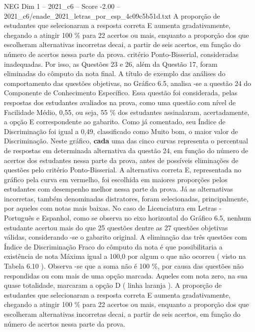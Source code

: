 \begin{textsample}{NEG Dim 1 – 2021\_c6 – Score -2.00 – 2021\_c6/enade\_2021\_letras\_por\_esp\_4c09c5b51d.txt}
A proporção de estudantes que selecionaram a resposta correta E aumenta gradativamente, chegando a atingir 100 \% para 22 acertos ou mais, enquanto a proporção dos que escolheram alternativas incorretas decai, a partir de seis acertos, em função do número de acertos nessa parte da prova. critério Ponto-Bisserial, consideradas inadequadas.
Por isso, as Questões 23 e 26, além da Questão 17, foram eliminadas do cômputo da nota final.
A título de exemplo das análises do comportamento das questões objetivas, no Gráfico 6.5, analisa -se a questão 24 do Componente de Conhecimento Específico.
Essa questão foi considerada, pelas respostas dos estudantes avaliados na prova, como uma questão com nível de Facilidade Médio, 0,55, ou seja, 55 \% dos estudantes assinalaram, acertadamente, a opção E correspondente ao gabarito.
Como já comentado, seu Índice de Discriminação foi igual a 0,49, classificado como Muito bom, o maior valor de Discriminação.
Neste gráfico, \textbf{cada} uma das cinco curvas representa o percentual de respostas em determinada alternativa da questão 24, em função do número de acertos dos estudantes nessa parte da prova, antes de possíveis eliminações de questões pelo critério Ponto-Bisserial.
A alternativa correta E, representada no gráfico pela curva em vermelho, foi escolhida em maiores proporções pelos estudantes com desempenho melhor nessa parte da prova.
Já as alternativas incorretas, também denominadas distratores, foram selecionadas, principalmente, por aqueles com notas mais baixas.
No caso de Licenciatura em Letras - Português e Espanhol, como se observa no eixo horizontal do Gráfico 6.5, nenhum estudante acertou mais do que 25 questões dentre as 27 questões objetivas válidas, considerando -se o gabarito original.
A eliminação das três questões com Índice de Discriminação Fraco do cômputo da nota é que possibilitaria a existência de nota Máxima igual a 100,0 por algum o que não ocorreu ( visto na Tabela 6.10 ).
Observa -se que a soma não é 100 \%, por causa das questões não respondidas ou com mais de uma opção marcada.
Aqueles com nota zero, na sua quase totalidade, marcaram a opção D ( linha laranja ).
A proporção de estudantes que selecionaram a resposta correta E aumenta gradativamente, chegando a atingir 100 \% para 22 acertos ou mais, enquanto a proporção dos que escolheram alternativas incorretas decai, a partir de seis acertos, em função do número de acertos nessa parte da prova.

\end{textsample}
